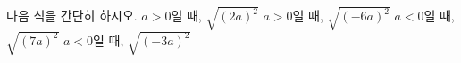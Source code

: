 다음 식을 간단히 하시오.
 $a>0$일 때, $\sqrt{(2a)^2}$
 $a>0$일 때, $\sqrt{(-6a)^2}$
 $a<0$일 때, $\sqrt{(7a)^2}$
 $a<0$일 때, $\sqrt{(-3a)^2}$
